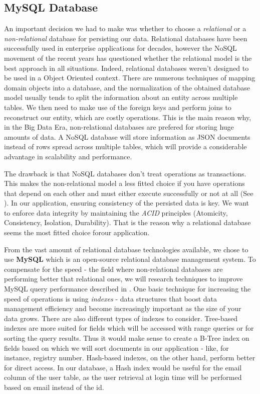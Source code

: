 \subsection{MySQL Database}
\label{section:mysqlDatabase}

An important decision we had to make was whether to choose a \textit{relational} or a \textit{non-relational} database for persisting our data. Relational databases have been successfully used in enterprise applications for decades, however the NoSQL movement of the recent years has questioned whether the relational model is the best approach in all situations. Indeed, relational databases weren't designed to be used in a Object Oriented context. There are numerous techniques of mapping domain objects into a database, and the normalization of the obtained database model usually tends to split the information about an entity across multiple tables. We then need to make use of the foreign keys and perform joins to reconstruct our entity, which are costly operations. This is the main reason why, in the Big Data Era, non-relational databases are prefered for storing huge amounts of data. A NoSQL database will store information as JSON documents instead of rows spread across multiple tables, which will provide a considerable advantage in scalability and performance.

The drawback is that NoSQL databases don't treat operations as transactions. This makes the non-relational model a less fitted choice if you have operations that depend on each other and must either execute successfully or not at all (See \cite{conciseGuideToDatabases}). In our application, ensuring consistency of the persisted data is key. We want to enforce data integrity by maintaining the \textit{ACID} principles (Atomicity, Consistency, Isolation, Durability). That is the reason why a relational database seems the most fitted choice forour application.

From the vast amount of relational database technologies available, we chose to use \textbf{MySQL} which is an open-source relational database management system. To compensate for the speed - the field where non-relational databases are performing better that relational ones, we will research techniques to improve MySQL query performance described in \cite{highPerformanceMySQL}. One basic technique for increasing the speed of operations is using \textit{indexes} - data structures that boost data management efficiency and become increasingly important as the size of your data grows. There are also different types of indexes to consider. Tree-based indexes are more suited for fields which will be accessed with range queries or for sorting the query results. Thus it would make sense to create a B-Tree index on fields based on which we will sort documents in our application - like, for instance, registry number. Hash-based indexes, on the other hand, perform better for direct access. In our database, a Hash index would be useful for the email column of the user table, as the user retrieval at login time will be performed based on email instead of the id.


